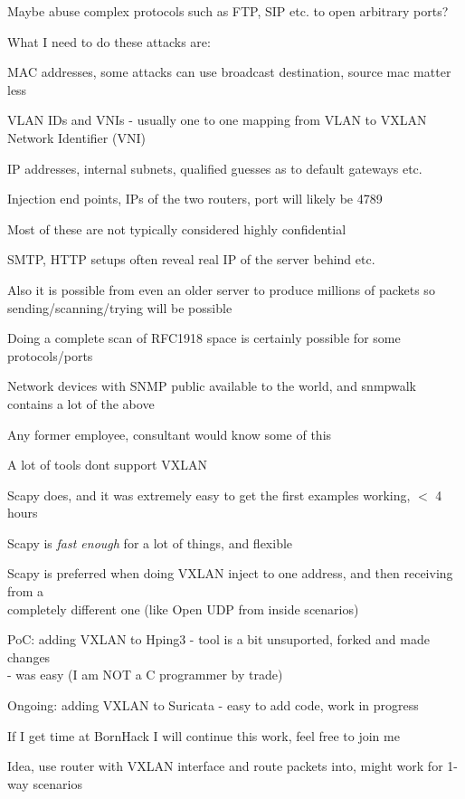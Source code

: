 \documentclass[18pt,landscape,a4paper,footrule]{foils}
\begin{document}
Maybe abuse complex protocols such as FTP, SIP etc. to open arbitrary ports?


What I need to do these attacks are:
\begin{list2}
\item MAC addresses, some attacks can use broadcast destination, source mac matter less
\item VLAN IDs and VNIs - usually one to one mapping from VLAN to VXLAN Network Identifier (VNI)
\item IP addresses, internal subnets, qualified guesses as to default gateways etc.
\item Injection end points, IPs of the two routers, port will likely be 4789
\item Most of these are not typically considered highly confidential
\item SMTP, HTTP setups often reveal real IP of the server behind etc.
\item Also it is possible from even an older server to produce millions of packets so sending/scanning/trying will be possible
\item Doing a complete scan of RFC1918 space is certainly possible for some protocols/ports
\item Network devices with SNMP public available to the world, and snmpwalk contains a lot of the above
\end{list2}

Any former employee, consultant would know some of this


\begin{list2}
\item A lot of tools dont support VXLAN
\item Scapy does, and it was extremely easy to get the first examples working, $<$ 4 hours
\item Scapy is \emph{fast enough} for a lot of things, and flexible
\item Scapy is preferred when doing VXLAN inject to one address, and then receiving from a \\
completely different one (like Open UDP from inside scenarios)
\item PoC: adding VXLAN to Hping3 - tool is a bit unsuported, forked and made changes\\
- was easy (I am NOT a C programmer by trade)
\item Ongoing: adding VXLAN to Suricata - easy to add code, work in progress
\item If I get time at BornHack I will continue this work, feel free to join me
\item Idea, use router with VXLAN interface and route packets into, might work for 1-way scenarios
\end{list2}
\end{document}
